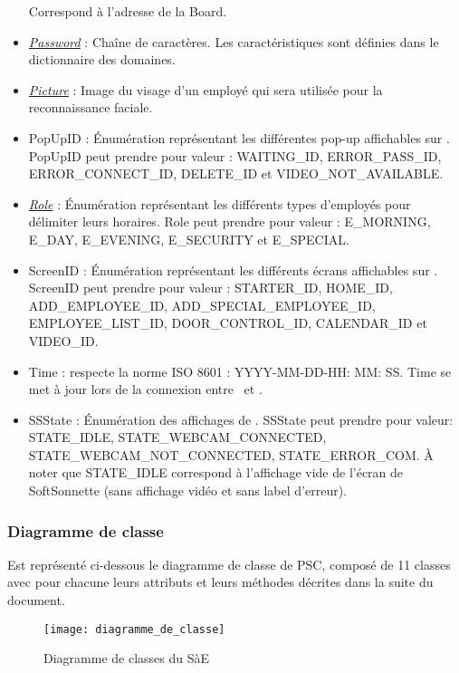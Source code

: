 \begin{itemize}
    Correspond à l'adresse de la Board.
    \item \hyperlink{mdp}{\textit{Password}} : Chaîne de caractères. Les caractéristiques sont définies dans le dictionnaire des domaines.
    \item \hyperlink{photo}{\textit{Picture}} : Image du visage d'un employé qui sera utilisée pour la reconnaissance faciale.
    \item PopUpID : Énumération représentant les différentes pop-up affichables sur \appliA.
    PopUpID peut prendre pour valeur : WAITING\_ID, ERROR\_PASS\_ID, ERROR\_CONNECT\_ID, DELETE\_ID et VIDEO\_NOT\_AVAILABLE.  
    \item \hyperlink{rol}{\textit{Role}} : Énumération représentant les différents types d'employés pour délimiter leurs horaires.
    Role peut prendre pour valeur : E\_MORNING, E\_DAY, E\_EVENING, E\_SECURITY et E\_SPECIAL.
    \item ScreenID : Énumération représentant les différents écrans affichables sur \appliA.
    ScreenID peut prendre pour valeur : STARTER\_ID, HOME\_ID, ADD\_EMPLOYEE\_ID, ADD\_SPECIAL\_EMPLOYEE\_ID, EMPLOYEE\_LIST\_ID, DOOR\_CONTROL\_ID, CALENDAR\_ID et VIDEO\_ID.
    \item Time : respecte la norme ISO 8601 : YYYY-MM-DD-HH: MM: SS.
    Time se met à jour lors de la connexion entre \appliA~et \appliLin.
    \item SSState : Énumération des affichages de \appliLin.
    SSState peut prendre pour valeur: STATE\_IDLE, STATE\_WEBCAM\_CONNECTED, STATE\_WEBCAM\_NOT\_CONNECTED, STATE\_ERROR\_COM.
    À noter que STATE\_IDLE correspond à l'affichage vide de l'écran de SoftSonnette (sans affichage vidéo et sans label d'erreur).
\end{itemize}

\newpage

\subsubsection{Diagramme de classe}%
Est représenté ci-dessous le diagramme de classe de PSC, composé de 11 classes avec pour chacune leurs attributs et leurs méthodes décrites dans la suite du document.

\begin{figure} [H]
    \centering
    \texttt{[image: diagramme\_de\_classe]}
    \caption{Diagramme de classes du SàE}
    \label{Diagramme_de_classes}
\end{figure}

